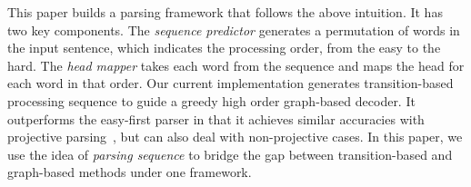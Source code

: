 This paper builds a parsing framework that follows the above
intuition. It has two key components. The {\em sequence predictor}
generates a permutation of words in the input sentence,
which indicates the processing order, from the easy to the hard.
The {\em head mapper} takes each word from the
sequence and maps the head for each word in that order.
Our current implementation generates transition-based processing sequence
to guide a greedy high order graph-based decoder.
It outperforms the easy-first parser
in that it achieves similar accuracies with projective
parsing~\cite{kong2014empirical}, but can also deal with non-projective cases.
In this paper, we use the idea of \textit{parsing sequence} to bridge
the gap between transition-based and graph-based methods under one framework.

